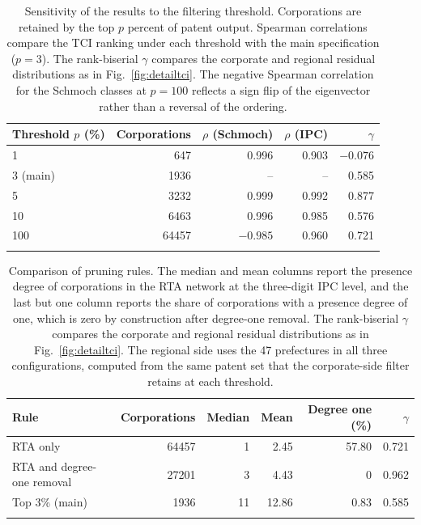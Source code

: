 \documentclass[lineno,pdflatex,sn-mathphys-num]{sn-jnl}%
\theoremstyle{thmstyleone}%
\theoremstyle{thmstyletwo}%
\theoremstyle{thmstylethree}%
\begin{document}
\begin{appendices}
\begin{table}[ht]
\caption{Sensitivity of the results to the filtering threshold.
Corporations are retained by the top $p$ percent of patent output.
Spearman correlations compare the TCI ranking under each threshold with the main specification ($p = 3$).
The rank-biserial $\gamma$ compares the corporate and regional residual distributions as in Fig.~\ref{fig:detailtci}.
The negative Spearman correlation for the Schmoch classes at $p = 100$ reflects a sign flip of the eigenvector rather than a reversal of the ordering.}
\label{tab:threshold}
\begin{tabular}{lrrrr}
\toprule
Threshold $p$ (\%) & Corporations & $\rho$ (Schmoch) & $\rho$ (IPC) & $\gamma$ \\
\midrule
1 & 647 & 0.996 & 0.903 & $-0.076$ \\
3 (main) & 1936 & -- & -- & 0.585 \\
5 & 3232 & 0.999 & 0.992 & 0.877 \\
10 & 6463 & 0.996 & 0.985 & 0.576 \\
100 & 64457 & $-0.985$ & 0.960 & 0.721 \\
\botrule
\end{tabular}
\end{table}

\begin{table}[ht]
\caption{Comparison of pruning rules.
The median and mean columns report the presence degree of corporations in the RTA network at the three-digit IPC level, and the last but one column reports the share of corporations with a presence degree of one, which is zero by construction after degree-one removal.
The rank-biserial $\gamma$ compares the corporate and regional residual distributions as in Fig.~\ref{fig:detailtci}.
The regional side uses the 47 prefectures in all three configurations, computed from the same patent set that the corporate-side filter retains at each threshold.}
\label{tab:pruning}
\begin{tabular}{lrrrrr}
\toprule
Rule & Corporations & Median & Mean & Degree one (\%) & $\gamma$ \\
\midrule
RTA only & 64457 & 1 & 2.45 & 57.80 & 0.721 \\
RTA and degree-one removal & 27201 & 3 & 4.43 & 0 & 0.962 \\
Top 3\% (main) & 1936 & 11 & 12.86 & 0.83 & 0.585 \\
\botrule
\end{tabular}
\end{table}


\end{appendices}
\end{document}
